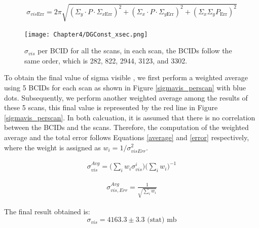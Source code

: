 \begin{equation}
\sigma_{vis\text{Err}}= 2 \pi \sqrt{ (\Sigma_{y} \cdot P \cdot \Sigma_{x\text{Err}})^{2} + (\Sigma_{x} \cdot P \cdot \Sigma_{y \text{Err}})^{2} + (\Sigma_{x} \Sigma_{y} P_{\text{Err}})^{2} }
\end{equation}

\begin{center}
  \begin{figure}[h!]
    \centering
    \texttt{[image: Chapter4/DGConst\_xsec.png]}
    \caption[$\sigma_{vis}$ per BCID for all scans]{ $\sigma_{vis}$ per BCID for all the scans,  in each scan, the BCIDs follow the same order, which is 282, 822, 2944, 3123, and 3302.}
    \label{sigmavis_perbcid}
  \end{figure}
\end{center}

To obtain the final value of sigma visible , we first perform a weighted average using 5 BCIDs for each scan as shown in Figure \ref{sigmavis_perscan} with blue dots. Subsequently, we perform another weighted average among the results of these 5 scans, this final value is represented by the red line in Figure \ref{sigmavis_perscan}. In both calcuation, it is assumed that there is no correlation between the BCIDs and the scans. Therefore, the computation of the weighted average and the total error  follows Equations \ref{average} and \ref{error} respectively, where the weight is assigned as $w_{i} = 1/\sigma_{visErr}^{2}$. 


\begin{eqnarray}
\sigma_{vis}^{Avg}=\Biggl(\displaystyle\sum_{i} w_{i}\sigma_{vis}^{i} \Biggr)\Biggl( \displaystyle\sum_{i} w_{i} \Biggr)^{-1}
\label{average}
\end{eqnarray}

\begin{eqnarray}
\sigma_{vis,Err}^{Avg}=\frac{1}{\sqrt{ \displaystyle\sum_{i} w_{i}}} 
\label{error}
\end{eqnarray}

The final result obtained is:
\begin{equation}
\sigma_{vis}=4163.3 \pm 3.3 \text{ (stat)  mb}
\end{equation}

